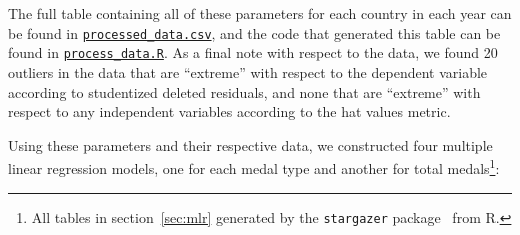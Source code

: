 \documentclass{mcmthesis}
\begin{document}
The full table containing all of these parameters for each country in each year can be found in \href{https://github.com/YanxiangShan/MCM-2524908/blob/main/code/MLR/processed_data.csv}{\texttt{processed\_data.csv}}, and the code that generated this table can be found in \href{https://github.com/YanxiangShan/MCM-2524908/blob/main/code/MLR/process_data.R}{\texttt{process\_data.R}}. As a final note with respect to the data, we found 20 outliers in the data that are \enquote{extreme} with respect to the dependent variable according to studentized deleted residuals, and none that are \enquote{extreme} with respect to any independent variables according to the hat values metric.

Using these parameters and their respective data, we constructed four multiple linear regression models, one for each medal type and another for total medals\footnote{
    All tables in section~\ref{sec:mlr} generated by the \texttt{stargazer} package~\parencite{hlavac2022stargazer} from R.
}:
\end{document}
